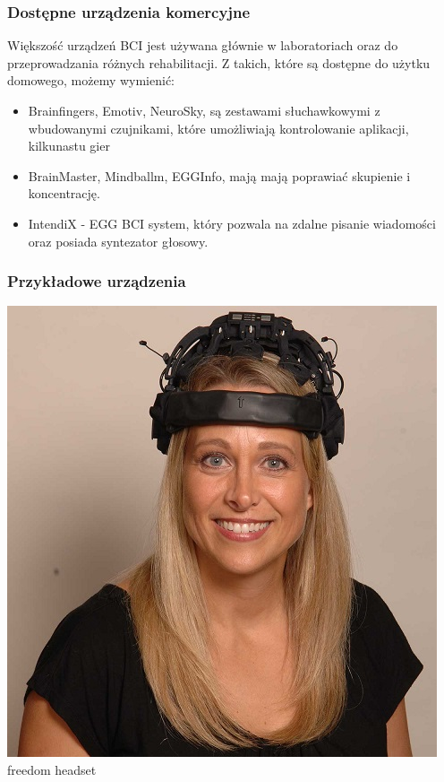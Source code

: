 \documentclass{beamer}
\begin{document}
\begin{frame}
    \frametitle{Dostępne urządzenia komercyjne}
    Większość urządzeń BCI jest używana głównie w laboratoriach oraz do przeprowadzania różnych rehabilitacji.
    Z takich, które są dostępne do użytku domowego, możemy wymienić:
    \begin{itemize}
        \item Brainfingers, Emotiv, NeuroSky, są zestawami słuchawkowymi z wbudowanymi czujnikami, które umożliwiają
        kontrolowanie aplikacji, kilkunastu gier
        \item BrainMaster, Mindballm, EGGInfo, mają mają poprawiać skupienie i koncentrację. 
        \item IntendiX - EGG BCI system, który pozwala na zdalne pisanie wiadomości oraz posiada syntezator głosowy.
    \end{itemize}
\end{frame}


\begin{frame}
    \frametitle{Przykładowe urządzenia}
    \begin{center}
        \includegraphics[scale=0.5]{freedom.jpg}
        \\

        {\tiny freedom headset }
    \end{center}    
\end{frame}
\end{document}
